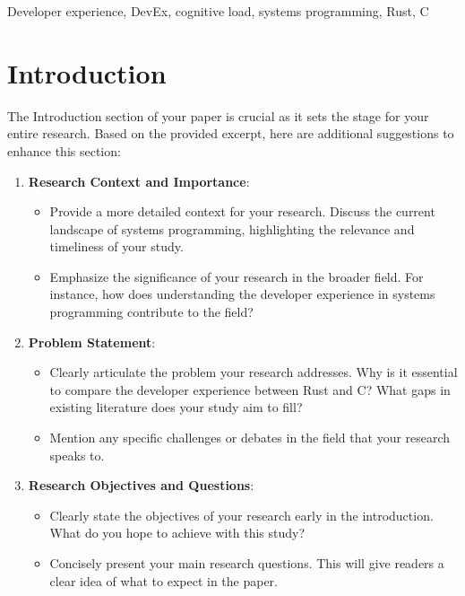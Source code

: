 \documentclass[conference]{IEEEtran}
\begin{document}
\begin{IEEEkeywords}
    Developer experience, DevEx, cognitive load, systems programming, Rust, C
\end{IEEEkeywords}

\section{Introduction}

 {\color{red} The Introduction section of your paper is crucial as it sets the stage for your entire research. Based on the provided excerpt, here are additional suggestions to enhance this section:
  \begin{enumerate}
      \item \textbf{Research Context and Importance}:
            \begin{itemize}
                \item Provide a more detailed context for your research. Discuss the current landscape of systems programming, highlighting the relevance and timeliness of your study.
                \item Emphasize the significance of your research in the broader field. For instance, how does understanding the developer experience in systems programming contribute to the field?
            \end{itemize}

      \item \textbf{Problem Statement}:
            \begin{itemize}
                \item Clearly articulate the problem your research addresses. Why is it essential to compare the developer experience between Rust and C? What gaps in existing literature does your study aim to fill?
                \item Mention any specific challenges or debates in the field that your research speaks to.
            \end{itemize}

      \item \textbf{Research Objectives and Questions}:
            \begin{itemize}
                \item Clearly state the objectives of your research early in the introduction. What do you hope to achieve with this study?
                \item Concisely present your main research questions. This will give readers a clear idea of what to expect in the paper.
            \end{itemize}


\end{enumerate}}
\end{document}
